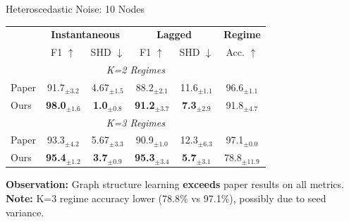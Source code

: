 \documentclass[aspectratio=169]{beamer}
\begin{document}
\begin{frame}{Heteroscedastic Noise: 10 Nodes}
\begin{table}
\centering
\small
\begin{tabular}{l|cc|cc|c}
\toprule
& \multicolumn{2}{c|}{\textbf{Instantaneous}} & \multicolumn{2}{c|}{\textbf{Lagged}} & \textbf{Regime} \\
& F1 $\uparrow$ & SHD $\downarrow$ & F1 $\uparrow$ & SHD $\downarrow$ & Acc. $\uparrow$ \\
\midrule
\multicolumn{6}{c}{\textit{K=2 Regimes}} \\
\midrule
\rowcolor{lightgray} Paper & 91.7$_{\pm3.2}$ & 4.67$_{\pm1.5}$ & 88.2$_{\pm2.1}$ & 11.6$_{\pm1.1}$ & 96.6$_{\pm1.1}$ \\
Ours & \textcolor{reprogreen}{\textbf{98.0}$_{\pm1.6}$} & \textcolor{reprogreen}{\textbf{1.0}$_{\pm0.8}$} & \textcolor{reprogreen}{\textbf{91.2}$_{\pm3.7}$} & \textcolor{reprogreen}{\textbf{7.3}$_{\pm2.9}$} & 91.8$_{\pm4.7}$ \\
\midrule
\multicolumn{6}{c}{\textit{K=3 Regimes}} \\
\midrule
\rowcolor{lightgray} Paper & 93.3$_{\pm4.2}$ & 5.67$_{\pm3.3}$ & 90.9$_{\pm1.0}$ & 12.3$_{\pm6.3}$ & 97.1$_{\pm0.0}$ \\
Ours & \textcolor{reprogreen}{\textbf{95.4}$_{\pm1.2}$} & \textcolor{reprogreen}{\textbf{3.7}$_{\pm0.9}$} & \textcolor{reprogreen}{\textbf{95.3}$_{\pm3.4}$} & \textcolor{reprogreen}{\textbf{5.7}$_{\pm3.1}$} & 78.8$_{\pm11.9}$ \\
\bottomrule
\end{tabular}
\end{table}

\vspace{0.3cm}
\textcolor{reprogreen}{\textbf{Observation:}} Graph structure learning \textbf{exceeds} paper results on all metrics. \\
\textcolor{warnred}{\textbf{Note:}} K=3 regime accuracy lower (78.8\% vs 97.1\%), possibly due to seed variance.
\end{frame}
\end{document}
